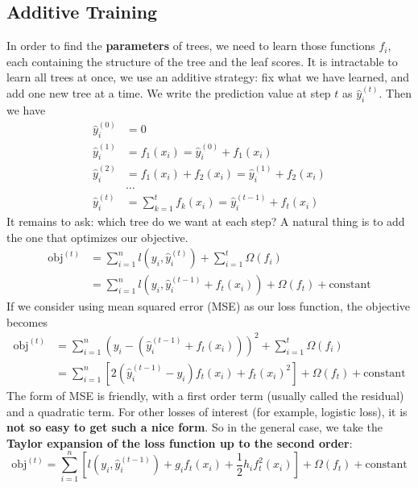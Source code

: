 \documentclass[a3paper, 12pt]{book} %
\begin{document}
\subsection{Additive Training}
In order to find the \textbf{parameters} of trees, we need to learn those functions $f_i$, each containing the structure of the tree and the leaf scores. It is intractable to learn all trees at once, we use an additive strategy: fix what we have learned, and add one new tree at a time. We write the prediction value at step $t$ as $\hat{y}_i^{(t)}$. Then we have 
\begin{equation}
\begin{split}\hat{y}_i^{(0)} &= 0\\
\hat{y}_i^{(1)} &= f_1(x_i) = \hat{y}_i^{(0)} + f_1(x_i)\\
\hat{y}_i^{(2)} &= f_1(x_i) + f_2(x_i)= \hat{y}_i^{(1)} + f_2(x_i)\\
&\dots\\
\hat{y}_i^{(t)} &= \sum_{k=1}^t f_k(x_i)= \hat{y}_i^{(t-1)} + f_t(x_i)\end{split}
\end{equation}
It remains to ask: which tree do we want at each step? A natural thing is to add the one that optimizes our objective.
\begin{equation}
\begin{split}\mathrm{obj}^{(t)} & = \sum_{i=1}^n l(y_i, \hat{y}_i^{(t)}) + \sum_{i=1}^t\Omega(f_i) \\
& = \sum_{i=1}^n l(y_i, \hat{y}_i^{(t-1)} + f_t(x_i)) + \Omega(f_t) + \mathrm{constant}\end{split}
\end{equation}
If we consider using mean squared error (MSE) as our loss function, the objective becomes
\begin{equation}
\begin{split}\mathrm{obj}^{(t)} & = \sum_{i=1}^n (y_i - (\hat{y}_i^{(t-1)} + f_t(x_i)))^2 + \sum_{i=1}^t\Omega(f_i) \\
& = \sum_{i=1}^n [2(\hat{y}_i^{(t-1)} - y_i)f_t(x_i) + f_t(x_i)^2] + \Omega(f_t) + \mathrm{constant}\end{split}
\end{equation}
The form of MSE is friendly, with a first order term (usually called the residual) and a quadratic term. For other losses of interest (for example, logistic loss), it is \textbf{not so easy to get such a nice form}. So in the general case, we take the \textbf{Taylor expansion of the loss function up to the second order}:
\begin{equation}
\mathrm{obj}^{(t)} = \sum_{i=1}^n [l(y_i, \hat{y}_i^{(t-1)}) + g_i f_t(x_i) + \frac{1}{2} h_i f_t^2(x_i)] + \Omega(f_t) + \mathrm{constant}
\end{equation}
\end{document}
